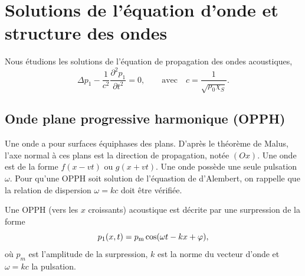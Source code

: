 \documentclass[12pt,fancy]{cours}
\begin{document}
\section{Solutions de l'équation d'onde et structure des ondes}
Nous étudions les solutions de l'équation de propagation des ondes acoustiques, 
\begin{equation}
	\Delta p_1-\frac{1}{c^2}\frac{\partial^2 p_1}{\partial t^2}=0, \qquad\mathrm{avec}\quad c=\frac{1}{\sqrt{\rho_0\chi_S}}.
\end{equation}
\subsection{Onde plane progressive harmonique (OPPH)}
 Une onde  a pour surfaces équiphases des plans. D’après le théorème de Malus, l’axe normal à ces plans est la direction de propagation, notée $(Ox)$. Une onde  est de la forme $f(x - vt)$ ou $g(x+v t)$. Une onde  possède une seule pulsation $\omega$. Pour qu’une OPPH soit solution de l’équastion de d’Alembert, on rappelle que la relation de dispersion $\omega = kc$ doit être vérifiée.

\begin{definition}\label{def:}
	Une OPPH (vers les $x$ croissants) acoustique est décrite par une surpression de la forme
	\begin{equation}
	p_1(x,t)=p_{\rm{m}}\cos(\omega t-kx+\varphi),
	\end{equation}
	où $p_m$ est l’amplitude de la surpression, $k$ est la norme du vecteur d'onde et $\omega = k c$  la pulsation.
\end{definition}
\end{document}
